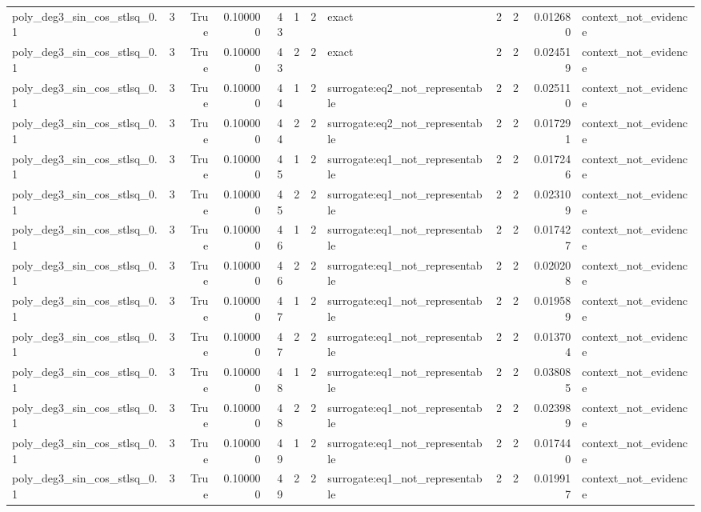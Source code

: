 \begin{tabular}{lrrrrrrlrrrl}
poly\_deg3\_sin\_cos\_stlsq\_0.1 & 3 & True & 0.100000 & 43 & 1 & 2 & exact & 2 & 2 & 0.012680 & context\_not\_evidence \\
poly\_deg3\_sin\_cos\_stlsq\_0.1 & 3 & True & 0.100000 & 43 & 2 & 2 & exact & 2 & 2 & 0.024519 & context\_not\_evidence \\
poly\_deg3\_sin\_cos\_stlsq\_0.1 & 3 & True & 0.100000 & 44 & 1 & 2 & surrogate:eq2\_not\_representable & 2 & 2 & 0.025110 & context\_not\_evidence \\
poly\_deg3\_sin\_cos\_stlsq\_0.1 & 3 & True & 0.100000 & 44 & 2 & 2 & surrogate:eq2\_not\_representable & 2 & 2 & 0.017291 & context\_not\_evidence \\
poly\_deg3\_sin\_cos\_stlsq\_0.1 & 3 & True & 0.100000 & 45 & 1 & 2 & surrogate:eq1\_not\_representable & 2 & 2 & 0.017246 & context\_not\_evidence \\
poly\_deg3\_sin\_cos\_stlsq\_0.1 & 3 & True & 0.100000 & 45 & 2 & 2 & surrogate:eq1\_not\_representable & 2 & 2 & 0.023109 & context\_not\_evidence \\
poly\_deg3\_sin\_cos\_stlsq\_0.1 & 3 & True & 0.100000 & 46 & 1 & 2 & surrogate:eq1\_not\_representable & 2 & 2 & 0.017427 & context\_not\_evidence \\
poly\_deg3\_sin\_cos\_stlsq\_0.1 & 3 & True & 0.100000 & 46 & 2 & 2 & surrogate:eq1\_not\_representable & 2 & 2 & 0.020208 & context\_not\_evidence \\
poly\_deg3\_sin\_cos\_stlsq\_0.1 & 3 & True & 0.100000 & 47 & 1 & 2 & surrogate:eq1\_not\_representable & 2 & 2 & 0.019589 & context\_not\_evidence \\
poly\_deg3\_sin\_cos\_stlsq\_0.1 & 3 & True & 0.100000 & 47 & 2 & 2 & surrogate:eq1\_not\_representable & 2 & 2 & 0.013704 & context\_not\_evidence \\
poly\_deg3\_sin\_cos\_stlsq\_0.1 & 3 & True & 0.100000 & 48 & 1 & 2 & surrogate:eq1\_not\_representable & 2 & 2 & 0.038085 & context\_not\_evidence \\
poly\_deg3\_sin\_cos\_stlsq\_0.1 & 3 & True & 0.100000 & 48 & 2 & 2 & surrogate:eq1\_not\_representable & 2 & 2 & 0.023989 & context\_not\_evidence \\
poly\_deg3\_sin\_cos\_stlsq\_0.1 & 3 & True & 0.100000 & 49 & 1 & 2 & surrogate:eq1\_not\_representable & 2 & 2 & 0.017440 & context\_not\_evidence \\
poly\_deg3\_sin\_cos\_stlsq\_0.1 & 3 & True & 0.100000 & 49 & 2 & 2 & surrogate:eq1\_not\_representable & 2 & 2 & 0.019917 & context\_not\_evidence \\

\end{tabular}
